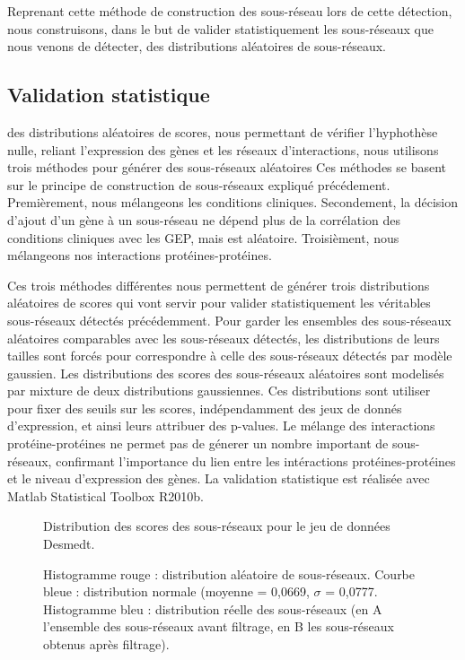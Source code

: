 			Reprenant cette méthode de construction des sous-réseau lors de cette détection, nous construisons, dans le but de valider statistiquement les sous-réseaux que nous venons de détecter, des distributions aléatoires de sous-réseaux.

		\subsection{\textcolor{green!45!black}{Validation statistique}}
			 des distributions aléatoires de scores, nous permettant de vérifier l'hyphothèse nulle, reliant l'expression des gènes et les réseaux d'interactions, nous utilisons trois méthodes pour générer des sous-réseaux aléatoires
			Ces méthodes se basent sur le principe de construction de sous-réseaux expliqué précédement.
			Premièrement, nous mélangeons les conditions cliniques.
			Secondement, la décision d'ajout d'un gène à un sous-réseau ne dépend plus de la corrélation des conditions cliniques avec les \acs{GEP}, mais est aléatoire.
			Troisièment, nous mélangeons nos interactions protéines-protéines.
			
			Ces trois méthodes différentes nous permettent de générer trois distributions aléatoires de scores qui vont servir pour valider statistiquement les véritables sous-réseaux détectés précédemment.
			Pour garder les ensembles des sous-réseaux aléatoires comparables avec les sous-réseaux détectés, les distributions de leurs tailles sont forcés pour correspondre à celle des sous-réseaux détectés par modèle gaussien.
			Les distributions des scores des sous-réseaux aléatoires sont modelisés par mixture de deux distributions gaussiennes.
			Ces distributions sont utiliser pour fixer des seuils sur les scores, indépendamment des jeux de donnés d'expression, et ainsi leurs attribuer des p-values.
			Le mélange des interactions protéine-protéines ne permet pas de génerer un nombre important de sous-réseaux, confirmant l'importance du lien entre les intéractions protéines-protéines et le niveau d'expression des gènes.
			La validation statistique est réalisée avec Matlab Statistical Toolbox R2010b.

			\begin{figure}
				\begin{center}
					\def\svgwidth{\columnwidth}
					\caption{Distribution des scores des sous-réseaux pour le jeu de données Desmedt.}
					\caption*{Histogramme rouge : distribution aléatoire de sous-réseaux. Courbe bleue : distribution normale (moyenne = 0,0669, $\sigma$ = 0,0777. Histogramme bleu : distribution réelle des sous-réseaux (en A l'ensemble des sous-réseaux avant filtrage, en B les sous-réseaux obtenus après filtrage).}
					\label{fig:Distribution}
				\end{center}
			\end{figure}

